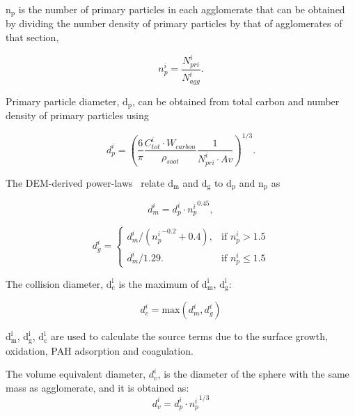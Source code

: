 $\mathrm{n_p}$ is the number of primary particles in each agglomerate that can be obtained by dividing the number density of primary particles by that of agglomerates of that section,

\begin{equation}
	n^i_p = \frac{N^i_{pri}}{N^i_{agg}}
	\label{eqn:n_p}.
\end{equation}

Primary particle diameter, $\mathrm{d_p}$, can be obtained from total carbon and number density of primary particles using

\begin{equation}
	d^i_p = \left(\frac{6}{\pi} \frac{C^i_{tot}\cdot W_{carbon}}{\rho_{soot}} \frac{1}{N^i_{pri}\cdot Av} \right)^{1/3}
	\label{eqn:d_p}.
\end{equation}

The DEM-derived power-laws~\citep{Kelesidis2017} relate $\mathrm{d_m}$ and $\mathrm{d_g}$ to $\mathrm{d_p}$ and $\mathrm{n_p}$ as

\begin{equation}
	d^i_{m} = d^i_p\cdot {n^i_p}^{0.45}
	\label{eqn:d_m},
\end{equation}

\begin{equation}
	d^i_g = 
	\left\{
	\begin{array}{lr}
		d^i_m/({n^i_p}^{-0.2}+0.4), & \text{if } n^i_p > 1.5\\
		d^i_m/1.29. & \text{if } n^i_p\leq 1.5
	\end{array}
	\right.
	\label{eqn:d_g}
\end{equation}

The collision diameter, $\mathrm{d^i_c}$ is the maximum of $\mathrm{d^i_{m}}$, $\mathrm{d^i_{g}}$:

\begin{equation}
	d^i_c = \mathrm{max}\left(d^i_m, d^i_g\right)
	\label{eqn:d_c}
\end{equation}

$\mathrm{d^i_{m}}$, $\mathrm{d^i_{g}}$, $\mathrm{d^i_{c}}$ are used to calculate the source terms due to the surface growth, oxidation, PAH adsorption and coagulation. 

The volume equivalent diameter, $d^i_v$, is the diameter of the sphere with the same mass as agglomerate, and it is obtained as:
\begin{equation}
	d^i_v = d^i_p \cdot {n^i_p}^{1/3}
	\label{eqn:d_v}
\end{equation}

